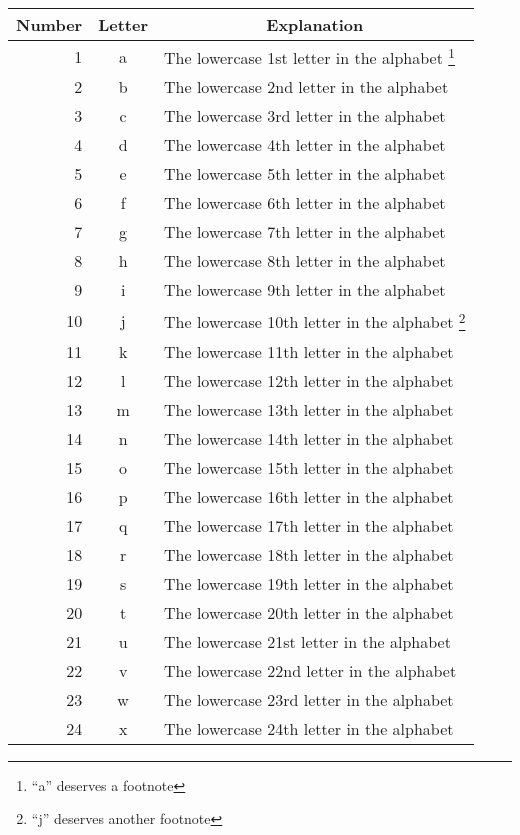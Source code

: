 \begin{longtable}{rcl}
  \toprule
  \multicolumn{1}{c}{Number} &
  \multicolumn{1}{c}{Letter} &
  \multicolumn{1}{c}{Explanation}\\
  \midrule
  \endhead
   1 & a & The lowercase 1st letter in the alphabet%
   \footnote{\enquote{a} deserves a footnote}\\
   2 & b & The lowercase 2nd letter in the alphabet\\
   3 & c & The lowercase 3rd letter in the alphabet\\
   4 & d & The lowercase 4th letter in the alphabet\\
   5 & e & The lowercase 5th letter in the alphabet\\
   6 & f & The lowercase 6th letter in the alphabet\\
   7 & g & The lowercase 7th letter in the alphabet\\
   8 & h & The lowercase 8th letter in the alphabet\\
   9 & i & The lowercase 9th letter in the alphabet\\
  10 & j & The lowercase 10th letter in the alphabet%
  \footnote{\enquote{j} deserves another footnote}\\
  11 & k & The lowercase 11th letter in the alphabet\\
  12 & l & The lowercase 12th letter in the alphabet\\
  13 & m & The lowercase 13th letter in the alphabet\\
  14 & n & The lowercase 14th letter in the alphabet\\
  15 & o & The lowercase 15th letter in the alphabet\\
  16 & p & The lowercase 16th letter in the alphabet\\
  17 & q & The lowercase 17th letter in the alphabet\\
  18 & r & The lowercase 18th letter in the alphabet\\
  19 & s & The lowercase 19th letter in the alphabet\\
  20 & t & The lowercase 20th letter in the alphabet\\
  21 & u & The lowercase 21st letter in the alphabet\\
  22 & v & The lowercase 22nd letter in the alphabet\\
  23 & w & The lowercase 23rd letter in the alphabet\\
  24 & x & The lowercase 24th letter in the alphabet\\

\end{longtable}
